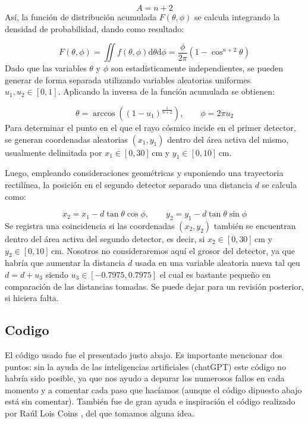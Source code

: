\documentclass[11pt]{article}
\newcommand{\D}{\mathrm{d}}
\begin{document}
\begin{equation}
A = n + 2
\end{equation}
Así, la función de distribución acumulada $F(\theta, \phi)$ se calcula integrando la densidad de probabilidad, dando como resultado:

\begin{equation}
F(\theta, \phi) = \iint f(\theta,\phi) \D  \theta \D \phi = \frac{\phi}{2\pi} \left( 1 - \cos^{n+2}\theta \right)
\end{equation}
Dado que las variables $\theta$ y $\phi$ son estadísticamente independientes, se pueden generar de forma separada utilizando variables aleatorias uniformes $u_1, u_2 \in [0,1]$. Aplicando la inversa de la función acumulada se obtienen:

\begin{equation}
\theta = \arccos\left( (1 - u_1)^{\frac{1}{n+2}} \right), \qquad \phi = 2\pi u_2
\end{equation}
Para determinar el punto en el que el rayo cósmico incide en el primer detector, se generan coordenadas aleatorias $(x_1, y_1)$ dentro del área activa del mismo, usualmente delimitada por $x_1 \in [0,30]\,\mathrm{cm}$ y $y_1 \in [0,10]\,\mathrm{cm}$.

Luego, empleando consideraciones geométricas y suponiendo una trayectoria rectilínea, la posición en el segundo detector separado una distancia $d$ se calcula como:

\begin{equation}
x_2 = x_1 - d \tan\theta \cos\phi, \qquad y_2 = y_1 - d \tan\theta \sin\phi
\end{equation}
Se registra una coincidencia si las coordenadas $(x_2, y_2)$ también se encuentran dentro del área activa del segundo detector, es decir, si $x_2 \in [0,30]\,\mathrm{cm}$ y $y_2 \in [0,10]\,\mathrm{cm}$. Nosotros no consideraremos aquí el grosor del detector, ya que habría que aumentar la distancia $d$ usada en una variable aleatoria nueva tal qeu $d=d+u_3$ siendo $u_3\in [-0.7975,0.7975]$ el cual es bastante pequeño en comparación de las distancias tomadas. Se puede dejar para un revisión posterior, si hiciera falta. 

\subsection{Codigo}

El código usado fue el presentado justo abajo. Es importante mencionar dos puntos: sin la ayuda de las inteligencias artificiales (chatGPT) este código no habría sido posible, ya que nos ayudo a depurar los numerosos fallos en cada momento y a comentar cada paso que hacíamos (aunque el código dipuesto abajo está sin comentar). También fue de gran ayuda e inspiración el código realizado por Raúl Lois Coins \cite{Raul}, del que tomamos alguna idea. \\[1em] 
\end{document}
